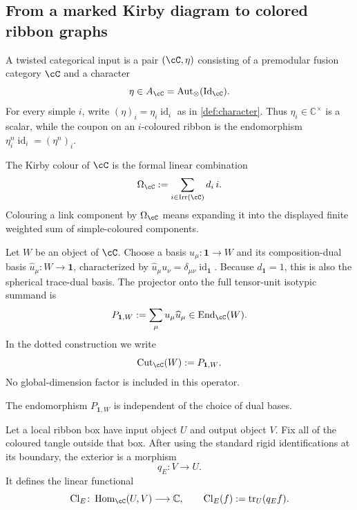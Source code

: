\subsection{From a marked Kirby diagram to colored ribbon graphs}
\label{subsec:graphical-construction}

\begin{definition}
\label{def:twisted-categorical-input}
A twisted categorical input is a pair $(\cC,\eta)$ consisting of a
premodular fusion category $\cC$ and a character
\[
  \eta\in A_{\cC}
  =\operatorname{Aut}_{\otimes}(\operatorname{Id}_{\cC}).
\]
For every simple $i$, write
$(\eta)_i=\eta_i\operatorname{id}_i$ as in
\cref{def:character}.  Thus $\eta_i\in\mathbb C^\times$ is a scalar, while
the coupon on an $i$-coloured ribbon is the endomorphism
$\eta_i^n\operatorname{id}_i=(\eta^n)_i$.
\end{definition}

\begin{definition}
\label{def:kirby-colour}
The Kirby colour of $\cC$ is the formal linear combination
\[
  \Omega_{\cC}:=
    \sum_{i\in\operatorname{Irr}(\cC)}d_i\,i.
\]
Colouring a link component by $\Omega_{\cC}$ means expanding it into the
displayed finite weighted sum of simple-coloured components.
\end{definition}

\begin{definition}
\label{def:tensor-unit-projector}
Let $W$ be an object of $\cC$.  Choose a basis
$u_\mu\colon\mathbf1\to W$ and its composition-dual basis
$\widehat u_\mu\colon W\to\mathbf1$, characterized by
$\widehat u_\mu u_\nu=\delta_{\mu\nu}\operatorname{id}_{\mathbf1}$.
Because $d_{\mathbf1}=1$, this is also the spherical trace-dual basis.  The
projector onto the full
tensor-unit isotypic summand is
\[
  P_{\mathbf1,W}:=\sum_\mu u_\mu\widehat u_\mu
  \in\operatorname{End}_{\cC}(W).
\]
In the dotted construction we write
\[
  \operatorname{Cut}_{\cC}(W):=P_{\mathbf1,W}.
\]
No global-dimension factor is included in this operator.
\end{definition}

\begin{remark}
\label{rem:tensor-unit-projector-basis-independence}
The endomorphism $P_{\mathbf1,W}$ is independent of the choice of dual
bases.
\end{remark}

\begin{definition}
\label{def:exterior-closure-context}
Let a local ribbon box have input object $U$ and output object $V$.  Fix all
of the coloured tangle outside that box.  After using the standard rigid
identifications at its boundary, the exterior is a morphism
\[
  q_E\colon V\longrightarrow U.
\]
It defines the linear functional
\[
  \operatorname{Cl}_E\colon
  \operatorname{Hom}_{\cC}(U,V)\longrightarrow\mathbb C,
  \qquad
  \operatorname{Cl}_E(f):=\operatorname{tr}_U(q_Ef).
\]
\end{definition}

